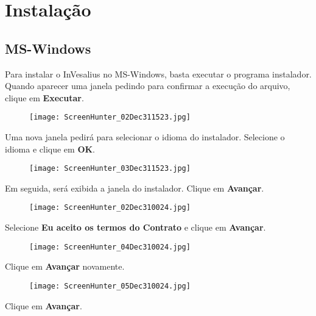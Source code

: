 \chapter{Instalação}

\section{MS-Windows}

Para instalar o InVesalius no MS-Windows, basta executar o programa instalador.
Quando aparecer uma janela pedindo para confirmar a execução do arquivo, clique
em \textbf{Executar}.

\begin{figure}[!htb]
\centering
\texttt{[image: ScreenHunter\_02Dec311523.jpg]}
\end{figure}

\newpage
Uma nova janela pedirá para selecionar o idioma do instalador. Selecione
o idioma e clique em \textbf{OK}.

\begin{figure}[!htb]
\centering
\texttt{[image: ScreenHunter\_03Dec311523.jpg]}
\end{figure}
 
\hspace{.2cm}

Em seguida, será exibida a janela do instalador. Clique em \textbf{Avançar}.

\begin{figure}[!htb]
\centering
\texttt{[image: ScreenHunter\_02Dec310024.jpg]}
\end{figure}

\newpage

Selecione \textbf{Eu aceito os termos do Contrato} e clique em \textbf{Avançar}.

\begin{figure}[!htb]
\centering
\texttt{[image: ScreenHunter\_04Dec310024.jpg]}
\end{figure}

\hspace{.2cm}

Clique em \textbf{Avançar} novamente.

\begin{figure}[!htb]
\centering
\texttt{[image: ScreenHunter\_05Dec310024.jpg]}
\end{figure}

\newpage

Clique em \textbf{Avançar}.

